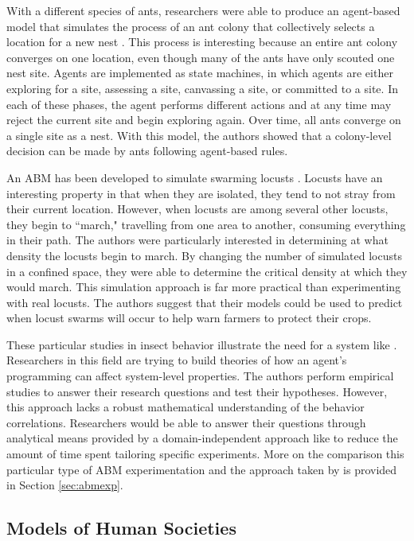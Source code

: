 With a different species of ants, researchers were able to produce an agent-based model that simulates the process of an ant colony that collectively selects a location for a new nest \cite{pratt2005agent}.
This process is interesting because an entire ant colony converges on one location, even though many of the ants have only scouted one nest site.
Agents are implemented as state machines, in which agents are either exploring for a site, assessing a site, canvassing a site, or committed to a site.
In each of these phases, the agent performs different actions and at any time may reject the current site and begin exploring again.
Over time, all ants converge on a single site as a nest.
With this model, the authors showed that a colony-level decision can be made by ants following agent-based rules.

An ABM has been developed to simulate swarming locusts \cite{buhl2006dom}.
Locusts have an interesting property in that when they are isolated, they tend to not stray from their current location.
However, when locusts are among several other locusts, they begin to ``march," travelling from one area to another, consuming everything in their path.
The authors were particularly interested in determining at what density the locusts  begin to march. By changing the number of simulated locusts in a confined space, they were able to determine the critical density at which they would march.
This simulation approach is far more practical than experimenting with real locusts.
The authors suggest that their models could be used to predict when locust swarms will occur to help warn farmers to protect their crops.

These particular studies in insect behavior illustrate the need for a system like \fw.
Researchers in this field are trying to build theories of how an agent's programming can affect system-level properties.
The authors perform empirical studies to answer their research questions and test their hypotheses.
However, this approach lacks a robust mathematical understanding of the behavior correlations.
Researchers would be able to answer their questions through analytical means provided by a domain-independent approach like \fw to reduce the amount of time spent tailoring specific experiments.
More on the comparison this particular type of ABM experimentation and the approach taken by \fw is provided in Section \ref{sec:abmexp}.

\subsection{Models of Human Societies}

